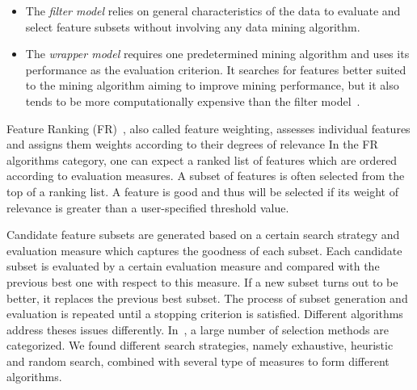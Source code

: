 \documentclass{elsart}
\begin{document}
\begin{itemize}
  \item The \emph{filter model} relies on general characteristics of the data to evaluate and select feature subsets without involving any data mining algorithm.

  \item The \emph{wrapper model} requires one predetermined mining algorithm and uses its performance as the evaluation criterion. It searches for features better suited to the mining algorithm aiming to improve mining performance, but it also tends to be more computationally expensive than the filter model~\cite{KJ97,Lan94}.
\end{itemize}




Feature Ranking (FR)~\cite{BL97,GE03}, also called feature weighting, assesses individual features and assigns them weights
according to their degrees of relevance %
In the FR algorithms category, one can expect a ranked list of features which are ordered according to evaluation measures. A subset of features is often selected from the top of a ranking list. A feature is good and thus will be selected if its weight of
relevance is greater than a user-specified threshold value.


Candidate feature subsets are generated based on a certain search strategy and evaluation measure which captures the goodness of each subset. Each candidate subset is evaluated by a certain evaluation measure and compared with the previous best one with respect to this measure. If a new subset turns out to be better, it replaces the previous best subset. The process of subset generation and evaluation is repeated until a  stopping criterion is satisfied. Different algorithms address theses issues differently. In~\cite{LY04}, a large number of selection methods are categorized. We found different search strategies, namely exhaustive, heuristic and random search, combined with several type of measures to form different algorithms.
\end{document}
